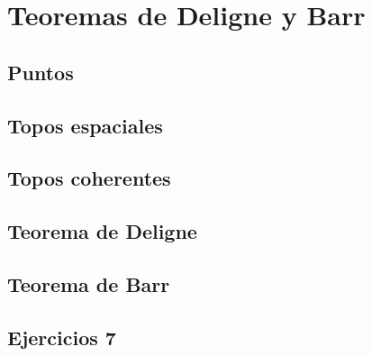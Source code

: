 \chapter{Teoremas de Deligne y Barr}
\label{chap:7}

\section{Puntos}
\label{sec:7.1}

\section{Topos espaciales}
\label{sec:7.2}

\section{Topos coherentes}
\label{sec:7.3}

\section{Teorema de Deligne}
\label{sec:7.4}

\section{Teorema de Barr}
\label{sec:7.5}

\section*{Ejercicios 7}
\label{sec:ejercicios-7}
